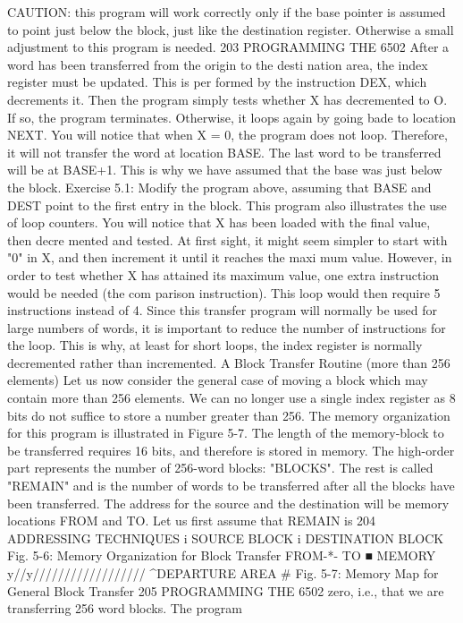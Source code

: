 CAUTION: this program will work correctly only if the base
pointer is assumed to point just below the block, just like the
destination register. Otherwise a small adjustment to this
program is needed.
203
PROGRAMMING THE 6502
After a word has been transferred from the origin to the desti
nation area, the index register must be updated. This is per
formed by the instruction DEX, which decrements it. Then the
program simply tests whether X has decremented to O. If so, the
program terminates. Otherwise, it loops again by going bade to
location NEXT.
You will notice that when X = 0, the program does not loop.
Therefore, it will not transfer the word at location BASE. The last
word to be transferred will be at BASE+1. This is why we have
assumed that the base was just below the block.
Exercise 5.1: Modify the program above, assuming that
BASE and DEST point to the first entry in the block.
This program also illustrates the use of loop counters. You will
notice that X has been loaded with the final value, then decre
mented and tested. At first sight, it might seem simpler to start
with "0" in X, and then increment it until it reaches the maxi
mum value. However, in order to test whether X has attained its
maximum value, one extra instruction would be needed (the com
parison instruction). This loop would then require 5 instructions
instead of 4. Since this transfer program will normally be used for
large numbers of words, it is important to reduce the number of
instructions for the loop. This is why, at least for short loops, the
index register is normally decremented rather than incremented.
A Block Transfer Routine (more than 256 elements)
Let us now consider the general case of moving a block which
may contain more than 256 elements. We can no longer use a
single index register as 8 bits do not suffice to store a number
greater than 256. The memory organization for this program is
illustrated in Figure 5-7. The length of the memory-block to be
transferred requires 16 bits, and therefore is stored in memory.
The high-order part represents the number of 256-word blocks:
"BLOCKS". The rest is called "REMAIN" and is the number of
words to be transferred after all the blocks have been transferred.
The address for the source and the destination will be memory
locations FROM and TO. Let us first assume that REMAIN is
204
ADDRESSING TECHNIQUES
i SOURCE BLOCK
i DESTINATION BLOCK
Fig. 5-6: Memory Organization for Block Transfer
FROM-*-
TO ■
MEMORY
y//y//////////////////
^DEPARTURE AREA #%
Fig. 5-7: Memory Map for General Block Transfer
205
PROGRAMMING THE 6502
zero, i.e., that we are transferring 256 word blocks. The program

